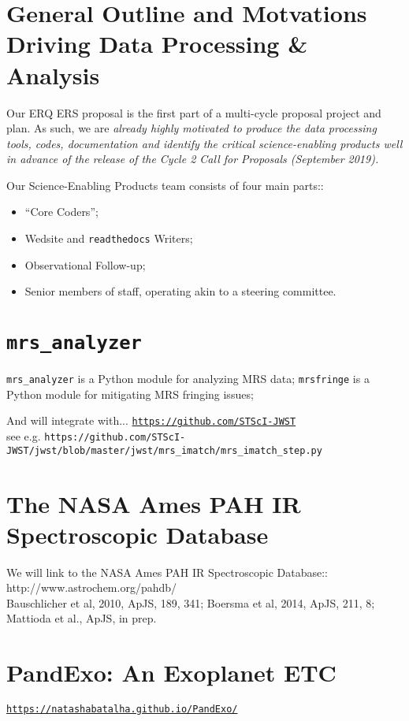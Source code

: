 
\section{General Outline and Motvations Driving Data Processing \& Analysis}
Our ERQ ERS proposal is the first part of a multi-cycle proposal project and plan. 
As such, we are {\it already highly motivated to produce the data processing tools, codes, documentation 
and identify the critical science-enabling products well in advance of the release of the Cycle 2 Call for Proposals (September 2019).} 

Our Science-Enabling Products team consists of four main parts::
\begin{itemize}
\item ``Core Coders''; 
\item  Wedsite and {\tt readthedocs} Writers; 
\item Observational Follow-up; 
\item Senior members of staff, operating akin to a steering committee. 
\end{itemize}

\section{{\tt mrs\_analyzer}} 
{\tt mrs\_analyzer} is  a Python module for analyzing MRS data; 
{\tt mrsfringe} is a Python module for mitigating MRS fringing issues; 

And will integrate with...
\href{https://github.com/STScI-JWST}{\tt https://github.com/STScI-JWST} \\
see e.g. 
{\tt https://github.com/STScI-JWST/jwst/blob/master/jwst/mrs\_imatch/mrs\_imatch\_step.py}

\section{The NASA Ames PAH IR Spectroscopic Database}
We will link to the NASA Ames PAH IR Spectroscopic Database:: \\
http://www.astrochem.org/pahdb/ \\
Bauschlicher et al, 2010, ApJS, 189, 341; Boersma et al, 2014, ApJS, 211, 8;  Mattioda et al., ApJS, in prep.\\


\section{PandExo: An Exoplanet ETC}
\href{https://natashabatalha.github.io/PandExo/}{\tt https://natashabatalha.github.io/PandExo/}


